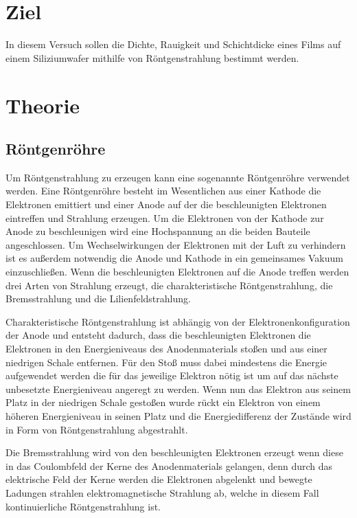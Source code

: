 \section*{Ziel}
    In diesem Versuch sollen die Dichte, Rauigkeit und Schichtdicke eines Films auf einem Siliziumwafer mithilfe von Röntgenstrahlung bestimmt werden.
\section{Theorie}
    \label{sec:theorie}
    \subsection{Röntgenröhre}
        Um Röntgenstrahlung zu erzeugen kann eine sogenannte Röntgenröhre verwendet werden.
        Eine Röntgenröhre besteht im Wesentlichen aus einer Kathode die Elektronen emittiert und einer Anode auf der die beschleunigten Elektronen eintreffen und Strahlung erzeugen.
        Um die Elektronen von der Kathode zur Anode zu beschleunigen wird eine Hochspannung an die beiden Bauteile angeschlossen.
        Um Wechselwirkungen der Elektronen mit der Luft zu verhindern ist es außerdem notwendig die Anode und Kathode in ein gemeinsames Vakuum einzuschließen.
        Wenn die beschleunigten Elektronen auf die Anode treffen werden drei Arten von Strahlung erzeugt, die  charakteristische Röntgenstrahlung, die Bremsstrahlung und die Lilienfeldstrahlung.

        Charakteristische Röntgenstrahlung ist abhängig von der Elektronenkonfiguration der Anode und entsteht dadurch, dass die beschleunigten Elektronen die Elektronen in den Energieniveaus des Anodenmaterials stoßen und aus einer niedrigen Schale entfernen.
        Für den Stoß muss dabei mindestens die Energie aufgewendet werden die für das jeweilige Elektron nötig ist um auf das nächste unbesetzte Energieniveau angeregt zu werden.
        Wenn nun das Elektron aus seinem Platz in der niedrigen Schale gestoßen wurde rückt ein Elektron von einem höheren Energieniveau in seinen Platz und die Energiedifferenz der Zustände wird in Form von Röntgenstrahlung abgestrahlt.

        Die Bremsstrahlung wird von den beschleunigten Elektronen erzeugt wenn diese in das Coulombfeld der Kerne des Anodenmaterials gelangen, denn durch das elektrische Feld der Kerne werden die Elektronen abgelenkt und bewegte Ladungen strahlen elektromagnetische Strahlung ab, welche in diesem Fall kontinuierliche Röntgenstrahlung ist.


